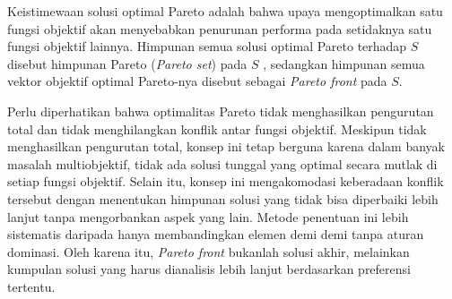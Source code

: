 Keistimewaan solusi optimal Pareto adalah bahwa upaya mengoptimalkan satu fungsi objektif akan menyebabkan penurunan performa pada setidaknya satu fungsi objektif lainnya. Himpunan semua solusi optimal Pareto terhadap $S$ disebut himpunan Pareto (\textit{Pareto set}) pada $S$ , sedangkan himpunan semua vektor objektif optimal Pareto-nya disebut sebagai \textit{Pareto front} pada $S$.

Perlu diperhatikan bahwa optimalitas Pareto tidak menghasilkan pengurutan total dan tidak menghilangkan konflik antar fungsi objektif. Meskipun tidak menghasilkan pengurutan total, konsep ini tetap berguna karena dalam banyak masalah multiobjektif, tidak ada solusi tunggal yang optimal secara mutlak di setiap fungsi objektif. Selain itu, konsep ini mengakomodasi keberadaan konflik tersebut dengan menentukan himpunan solusi yang tidak bisa diperbaiki lebih lanjut tanpa mengorbankan aspek yang lain. Metode penentuan ini lebih sistematis daripada hanya membandingkan elemen demi demi tanpa aturan dominasi. Oleh karena itu, \textit{Pareto front} bukanlah solusi akhir, melainkan kumpulan solusi yang harus dianalisis lebih lanjut berdasarkan preferensi tertentu.
